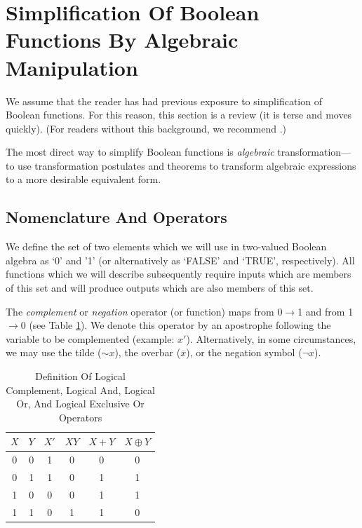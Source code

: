 \section[Simplification By Algebraic Manipulation]
        {Simplification Of Boolean Functions By Algebraic Manipulation}
\label{cbal0:ssam0}

We assume that the reader has had previous exposure to 
simplification of
Boolean functions.  For this reason, this section is a review (it is terse
and moves quickly).  (For readers without this background, we
recommend \cite{bibref:b:manodigitaldesignseconded}.)

The most direct way to simplify Boolean functions is 
\emph{algebraic}
transformation---to use transformation postulates and 
theorems to transform algebraic
expressions to a more desirable equivalent form.


\subsection{Nomenclature And Operators}
\label{cbal0:ssam0:snom0}

We define the set of two elements which we will use in 
two-valued Boolean
algebra as `0' and '1' (or alternatively as 
`FALSE' and `TRUE', respectively).
All functions which we will describe subsequently require
inputs which are members of this set and will produce outputs
which are also members of this set.

The \emph{complement} or \emph{negation} operator (or function)
maps from 0$\rightarrow$1 and from 1$\rightarrow$0 (see Table 
\ref{tbl:cbal0:ssam0:snom0:01}).
We denote this operator
by an apostrophe
following the variable to be complemented (example: $x'$).
Alternatively, in some circumstances, we may use the
tilde ($\sim{}x$), the overbar ($\overline{x}$), or
the negation symbol ($\neg{}x$).

\begin{table}
\caption{Definition Of Logical Complement, Logical And, Logical Or, And Logical 
         Exclusive Or Operators}
\label{tbl:cbal0:ssam0:snom0:01}
\begin{center}
\begin{tabular}{|c|c||c|c|c|c|}
\hline
$X$ & $Y$  & $X'$ & $XY$ & $X+Y$ & $X \oplus{} Y$ \\
\hline
\hline
 0 & 0 & 1 & 0 & 0 & 0 \\
\hline
 0 & 1 & 1 & 0 & 1 & 1 \\
\hline
 1 & 0 & 0 & 0 & 1 & 1 \\
\hline
 1 & 1 & 0 & 1 & 1 & 0 \\
\hline
\end{tabular}
\end{center}
\end{table}

